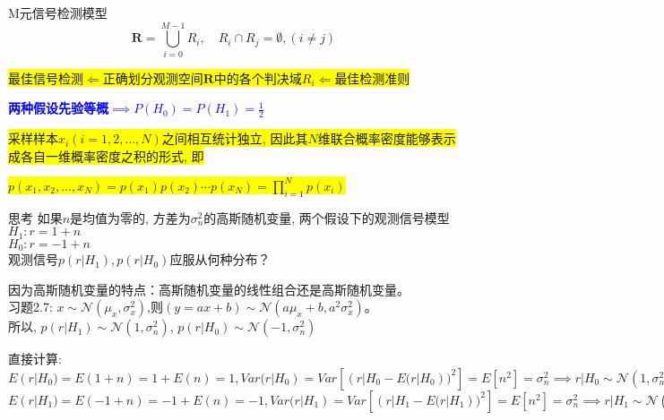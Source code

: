 \begin{frame}{M元信号检测模型}
\[\bm{R}=\bigcup\limits_{i=0}^{M-1}R_i, \quad R_i\cap R_j=\emptyset,(i\ne j) \]

\bigskip

\colorbox{yellow}{最佳信号检测$\Leftarrow$正确划分观测空间$\bm{R}$中的各个判决域$R_i\Leftarrow$最佳检测准则} 

\bigskip

\textcolor{blue}{\textbf{两种假设先验等概$\implies P(H_0)=P(H_1)=\frac{1}{2}$}}

\bigskip


\tiny{
\colorbox{yellow}{采样样本$x_i(i=1,2,\dots,N)$之间相互统计独立, 因此其$N$维联合概率密度能够表示成各自一维概率密度之积的形式, 即}\\
}

\colorbox{yellow}{$p(x_1,x_2,\dots,x_N)=p(x_1)p(x_2)\cdots p(x_N)=\prod\limits_{i=1}^Np(x_i)$} 
\end{frame}

\begin{frame}[shrink]
\begin{block}{思考}
	如果$n$是均值为零的, 方差为$\sigma_n^2$的高斯随机变量, 两个假设下的观测信号模型\\
	$H_1: r=1+n$\\
	$H_0: r=-1+n$\\
	观测信号$p(r|H_1),p(r|H_0)$应服从何种分布？
\end{block}
\begin{block}{}
	因为高斯随机变量的特点：高斯随机变量的线性组合还是高斯随机变量。\\
	习题2.7: $x\sim\mathcal{N}(\mu_x,\sigma_x^2)$,则$(y=ax+b)\sim\mathcal{N}(a\mu_x+b,a^2\sigma_x^2)$。\\
	所以, $p(r|H_1)\sim\mathcal{N}(1,\sigma_n^2)$, $p(r|H_0)\sim\mathcal{N}(-1,\sigma_n^2)$
\end{block}
\begin{block}{}
	直接计算: $E(r|H_0)=E(1+n)=1+E(n)=1,Var(r|H_0)=Var[(r|H_0-E(r|H_0))^2]=E[n^2]=\sigma_n^2\implies r|H_0\sim\mathcal{N}(1,\sigma_n^2)$\\
	$E(r|H_1)=E(-1+n)=-1+E(n)=-1,Var(r|H_1)=Var[(r|H_1-E(r|H_1))^2]=E[n^2]=\sigma_n^2\implies r|H_1\sim\mathcal{N}(1,\sigma_n^2)$
\end{block}
\end{frame}

